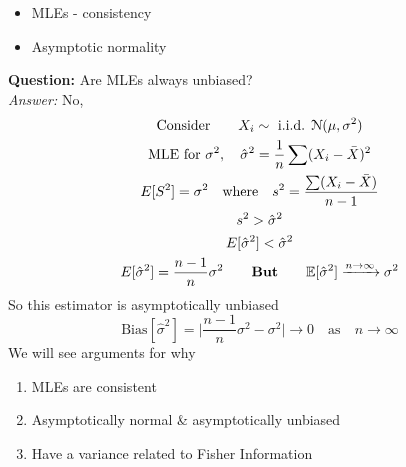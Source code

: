 \begin{itemize}
	\item MLEs - consistency
	\item Asymptotic normality
\end{itemize}
\textbf{Question:} Are MLEs always unbiased?\\
\emph{Answer:} No, 
\begin{gather*}
	\text{Consider} \qquad X_i \sim \text{ i.i.d. } \mathcal{N}(\mu, \sigma^2)\\
	\text{MLE for } \sigma^2, \quad \hat{\sigma}^2 = \frac{1}{n}\sum (X_i - \bar{X})^2\\
	E[S^2] = \sigma^2 \quad \text{where} \quad s^2 = \frac{\sum (X_i - \bar{X})}{n-1}\\
	s^2 > \hat{\sigma}^2\\ 
	E[\hat{\sigma}^2] < \hat{\sigma}^2\\
	E[\hat{\sigma}^2] = \frac{n-1}{n} \sigma^2 \qquad \textbf{But} \qquad \mathbb{E}[\hat{\sigma}^2] \xrightarrow{n \rightarrow \infty} \sigma^2
\end{gather*}
So this estimator is asymptotically unbiased
\begin{equation*}
	\text{Bias}[\hat{\sigma}^2] = \bigg| \frac{n-1}{n} \sigma^2 - \sigma^2 \bigg| \rightarrow 0 \quad \text{as} \quad n \rightarrow \infty
\end{equation*}
We will see arguments for why
\begin{enumerate}
	\item MLEs are consistent
	\item Asymptotically normal \& asymptotically unbiased
	\item Have a variance related to Fisher Information
\end{enumerate}